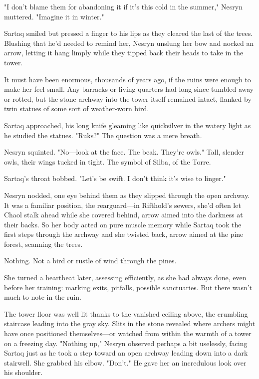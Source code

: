 "I don't blame them for abandoning it if it's this cold in the summer," Nesryn muttered. "Imagine it in winter."

Sartaq smiled but pressed a finger to his lips as they cleared the last of the trees. Blushing that he'd needed to remind her, Nesryn unslung her bow and nocked an arrow, letting it hang limply while they tipped back their heads to take in the tower.

It must have been enormous, thousands of years ago, if the ruins were enough to make her feel small. Any barracks or living quarters had long since tumbled away or rotted, but the stone archway into the tower itself remained intact, flanked by twin statues of some sort of weather-worn bird.

Sartaq approached, his long knife gleaming like quicksilver in the watery light as he studied the statues. "Ruks?" The question was a mere breath.

Nesryn squinted. "No---look at the face. The beak. They're 
owls." Tall, slender owls, their wings tucked in tight. The symbol of Silba, of the Torre.

Sartaq's throat bobbed. "Let's be swift. I don't think it's wise to linger."

Nesryn nodded, one eye behind them as they slipped through the open archway. It was a familiar position, the rearguard---in Rifthold's sewers, she'd often let Chaol stalk ahead while she covered behind, arrow aimed into the darkness at their backs. So her body acted on pure muscle memory while Sartaq took the first steps through the archway and she twisted back, arrow aimed at the pine forest, scanning the trees.

Nothing. Not a bird or rustle of wind through the pines.

She turned a heartbeat later, assessing efficiently, as she had always done, even before her training: marking exits, pitfalls, possible sanctuaries. But there wasn't much to note in the ruin.

The tower floor was well lit thanks to the vanished ceiling above, the crumbling staircase leading into the gray sky. Slits in the stone revealed where archers might have once positioned themselves---or watched from within the warmth of a tower on a freezing day. "Nothing up," Nesryn observed perhaps a bit uselessly, facing Sartaq just as he took a step toward an open archway leading down into a dark stairwell. She grabbed his elbow. "Don't." He gave her an incredulous look over his shoulder.

